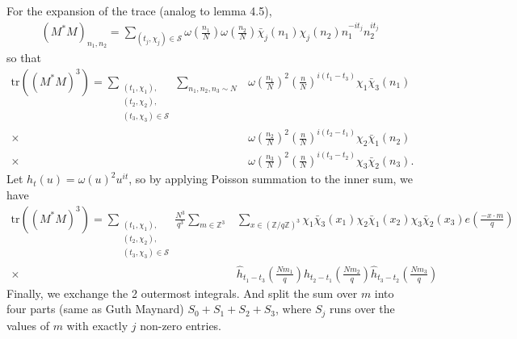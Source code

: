 For the expansion of the trace (analog to lemma 4.5), 
\begin{align*}
    (M^*M)_{n_1,n_2} = \sum_{(t_j,\chi_j)\in \mathcal{S}} \omega\left(\frac{n_1}{N}\right)\omega\left(\frac{n_2}{N}\right)
    \bar{\chi}_j(n_1)\chi_j(n_2)n_1^{-it_j}n_2^{it_j}
\end{align*}
so that \begin{align*}
    \textrm{tr}((M^*M)^3)=\sum_{\substack{(t_1,\chi_1),\\(t_2,\chi_2),\\(t_3,\chi_3)\in\mathcal{S}}}\sum_{n_1,n_2,n_3\sim N} & 
    \omega\left(\frac{n_1}{N}\right)^2 \left(\frac{n}{N}\right)^{i(t_1-t_3)}\chi_1\bar{\chi}_3(n_1)\\
    \times \ &\omega\left(\frac{n_2}{N}\right)^2 \left(\frac{n}{N}\right)^{i(t_2-t_1)}\chi_2\bar{\chi}_1(n_2)\\
    \times \ &\omega\left(\frac{n_3}{N}\right)^2 \left(\frac{n}{N}\right)^{i(t_3-t_2)}\chi_3\bar{\chi}_2(n_3).
\end{align*}
Let $h_t(u)=\omega(u)^2u^{it}$,
so by applying Poisson summation to the inner sum, we have \begin{align*}
    \textrm{tr}((M^*M)^3)=\sum_{\substack{(t_1,\chi_1),\\(t_2,\chi_2),\\(t_3,\chi_3)\in\mathcal{S}}}
    \frac{N^3}{q^3}\sum_{m\in\mathbb{Z}^3}&\sum_{x\in (\mathbb{Z}/q\mathbb{Z})^3}\chi_1\bar{\chi}_3(x_1)\chi_2\bar{\chi}_1(x_2)\chi_3\bar{\chi}_2(x_3) e\left(\frac{-x\cdot m}{q}\right)\\
    \times \ &\hat{h}_{t_1-t_3}\left(\frac{Nm_1}{q}\right)\hat{h}_{t_2-t_1}\left(\frac{Nm_2}{q}\right)\hat{h}_{t_3-t_2}\left(\frac{Nm_3}{q}\right) 
\end{align*}
Finally, we exchange the 2 outermost integrals. And split the sum over $m$ into four parts (same as Guth Maynard) $S_0+ S_1+S_2+S_3$,
where $S_j$ runs over the values of $m$ with exactly $j$ non-zero entries.

